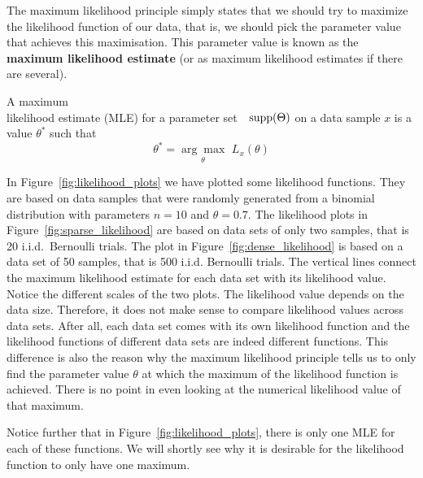 The maximum likelihood principle simply states that we should try to maximize the likelihood function of
our data, that is, we should pick the parameter value that achieves this maximisation. This parameter value
is known as the \textbf{maximum likelihood estimate} (or as maximum likelihood estimates if there are several). 

\begin{Definition}
A maximum \\ likelihood estimate (MLE) for a parameter set~~$ \operatorname{supp}(\Theta) $ on a data sample $ x $ 
is a value $ \theta^{*} $ such that
$$ \theta^{*} = \underset{\theta}{\arg\max}\, \, L_{x}(\theta) $$
\end{Definition}

In Figure~\ref{fig:likelihood_plots} we have plotted some likelihood functions. They are based on data
samples that were randomly generated from a binomial distribution with parameters $ n=10 $ and 
$ \theta=0.7 $. The likelihood plots in Figure~\ref{fig:sparse_likelihood} are based on data sets of only
two samples, that is 20 i.i.d.\ Bernoulli trials. The plot in Figure~\ref{fig:dense_likelihood} is based on a 
data set of 50 samples, that is 500 i.i.d. Bernoulli trials. 
The vertical lines connect the maximum likelihood estimate
for each data set with its likelihood value. Notice the different scales of the two plots. The likelihood value depends on the
data size. Therefore, it does not make sense to compare likelihood values across data sets. After all, each data set comes with its own
likelihood function and the likelihood functions of different data sets are indeed different functions. This difference is also the
reason why the maximum likelihood principle tells us to only find the parameter value $ \theta $ at which the maximum of the
likelihood function is achieved. There is no point in even looking at the numerical likelihood value of that maximum.

Notice further that in Figure~\ref{fig:likelihood_plots}, there is only one MLE for each of these functions. We will shortly see why it is desirable for 
the likelihood function to only have one maximum.

